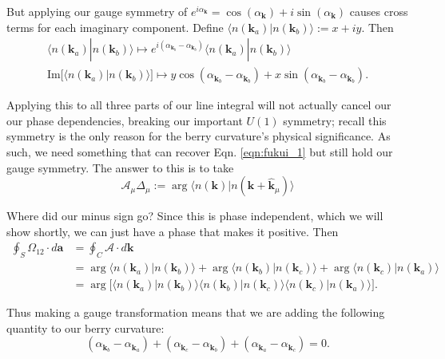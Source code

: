 \documentclass[12pt]{revtex4-2}
\newcommand{\imag}{\text{Im}}
\begin{document}
But applying our gauge symmetry of $e^{i\alpha_\mathbf{k}} = \cos(\alpha_\mathbf{k}) + i\sin(\alpha_\mathbf{k})$ causes cross terms for each imaginary component.  Define $\langle n(\mathbf{k}_a)|n(\mathbf{k}_b)\rangle := x + iy$.  Then
\begin{gather}
    \langle n(\mathbf{k}_a)|n(\mathbf{k}_b)\rangle \mapsto e^{i(\alpha_{\mathbf{k}_b} - \alpha_{\mathbf{k}_b})} \langle n(\mathbf{k}_a)|n(\mathbf{k}_b)\rangle \\
    \imag\big[\langle n(\mathbf{k}_a)| n(\mathbf{k}_b)\rangle\big] \mapsto y\cos(\alpha_{\mathbf{k}_b} - \alpha_{\mathbf{k}_b}) + x\sin(\alpha_{\mathbf{k}_b} - \alpha_{\mathbf{k}_b}).
\end{gather}

Applying this to all three parts of our line integral will not actually cancel our our phase dependencies, breaking our important $U(1)$ symmetry; recall this symmetry is the only reason for the berry curvature's physical significance.  As such, we need something that can recover Eqn. \ref{eqn:fukui_1} but still hold our gauge symmetry.  The answer to this is to take 
\begin{equation}
    \boxed{\mathcal{A}_\mu \Delta_\mu := \arg \langle n(\mathbf{k})|n(\mathbf{k} + \hat{\mathbf{k}}_\mu) \rangle }
\end{equation}

Where did our minus sign go?  Since this is phase independent, which we will show shortly, we can just have a phase that makes it positive. Then
\begin{align}
    \oint_S \Omega_{12} \cdot d\mathbf{a} &= \oint_C \mathcal{A}\cdot d\mathbf{k} \\
    &= \arg\langle n(\mathbf{k}_a)|n(\mathbf{k}_b)\rangle + \arg\langle n(\mathbf{k}_b)|n(\mathbf{k}_c)\rangle + \arg\langle n(\mathbf{k}_c)|n(\mathbf{k}_a)\rangle \\
    &= \arg \big[\langle n(\mathbf{k}_a)|n(\mathbf{k}_b)\rangle\langle n(\mathbf{k}_b)|n(\mathbf{k}_c)\rangle\langle n(\mathbf{k}_c)|n(\mathbf{k}_a)\rangle \big].
\end{align}

Thus making a gauge transformation means that we are adding the following quantity to our berry curvature: 
\begin{equation}
    (\alpha_{\mathbf{k}_b} - \alpha_{\mathbf{k}_a}) + (\alpha_{\mathbf{k}_c} - \alpha_{\mathbf{k}_b}) + (\alpha_{\mathbf{k}_a} - \alpha_{\mathbf{k}_c}) = 0.
\end{equation}
\end{document}
